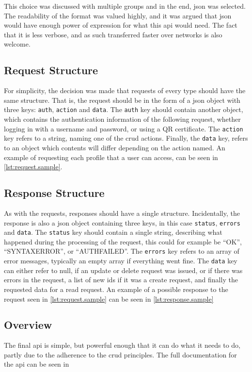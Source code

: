 This choice was discussed with multiple groups and in the end, \ac{json} was selected. The readability of the format was valued highly, and it
was argued that \ac{json} would have enough power of expression for what this \ac{api} would need. The fact that it is less verbose, and as such
transferred faster over networks is also welcome.

\subsection{Request Structure}

For simplicity, the decision was made that requests of every type should have the same structure. That is, the request should be in the form of
a \ac{json} object with three keys: \texttt{auth}, \texttt{action} and \texttt{data}. The \texttt{auth} key should contain another object, which
contains the authentication information of the following request, whether logging in with a username and password, or using a QR certificate. The
\texttt{action} key refers to a string, naming one of the \ac{crud} actions. Finally, the \texttt{data} key, refers to an object which contents
will differ depending on the action named. An example of requesting each profile that a user can access, can be seen in \autoref{lst:request.sample}.



\subsection{Response Structure}

As with the requests, responses should have a single structure. Incidentally, the response is also a \ac{json} object containing three keys, in this
case \texttt{status}, \texttt{errors} and \texttt{data}. The \texttt{status} key should contain a single string, describing what happened during the
processing of the request, this could for example be ``OK'', ``SYNTAXERROR'', or ``AUTHFAILED''. The \texttt{errors} key refers to an array of error
messages, typically an empty array if everything went fine. The \texttt{data} key can either refer to null, if an update or delete request was issued,
or if there was errors in the request, a list of new ids if it was a create request, and finally the requested data for a read request. An example of
a possible response to the request seen in \autoref{lst:request.sample} can be seen in \autoref{lst:response.sample}



\subsection{Overview}

The final \ac{api} is simple, but powerful enough that it can do what it needs to do, partly due to the adherence to the \ac{crud} principles. The full
documentation for the \ac{api} can be seen in %
